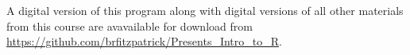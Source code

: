 \documentclass{article}[12pt]
\begin{document}

A digital version of this program along with digital versions of all other materials from this course are avavailable for download from \url{https://github.com/brfitzpatrick/Presents_Intro_to_R}.
\end{document}
